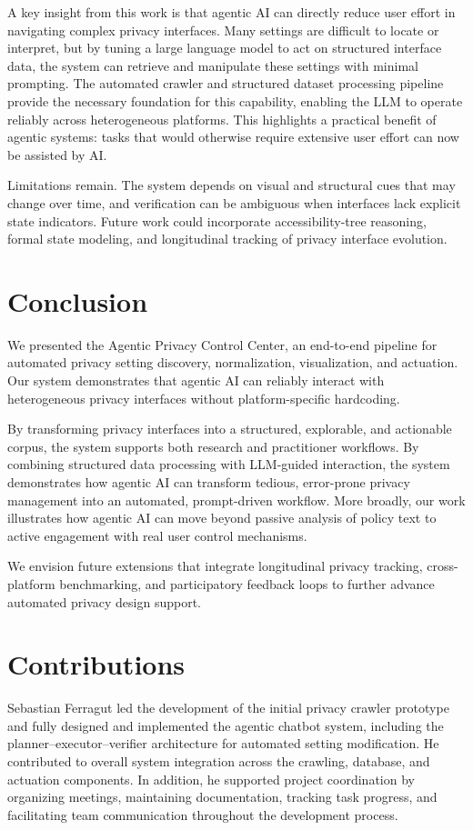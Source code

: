 \documentclass[12pt,letterpaper]{article}
\begin{document}
A key insight from this work is that agentic AI can directly reduce user effort in navigating complex privacy interfaces. Many settings are difficult to locate or interpret, but by tuning a large language model to act on structured interface data, the system can retrieve and manipulate these settings with minimal prompting. The automated crawler and structured dataset processing pipeline provide the necessary foundation for this capability, enabling the LLM to operate reliably across heterogeneous platforms. This highlights a practical benefit of agentic systems: tasks that would otherwise require extensive user effort can now be assisted by AI.

Limitations remain. The system depends on visual and structural cues that may change over time, and verification can be ambiguous when interfaces lack explicit state indicators. Future work could incorporate accessibility-tree reasoning, formal state modeling, and longitudinal tracking of privacy interface evolution.

\section{Conclusion }
We presented the Agentic Privacy Control Center, an end-to-end pipeline for automated privacy setting discovery, normalization, visualization, and actuation. Our system demonstrates that agentic AI can reliably interact with heterogeneous privacy interfaces without platform-specific hardcoding.

By transforming privacy interfaces into a structured, explorable, and actionable corpus, the system supports both research and practitioner workflows. By combining structured data processing with LLM-guided interaction, the system demonstrates how agentic AI can transform tedious, error-prone privacy management into an automated, prompt-driven workflow. More broadly, our work illustrates how agentic AI can move beyond passive analysis of policy text to active engagement with real user control mechanisms.

We envision future extensions that integrate longitudinal privacy tracking, cross-platform benchmarking, and participatory feedback loops to further advance automated privacy design support.

\section{Contributions }
Sebastian Ferragut led the development of the initial privacy crawler prototype and fully designed and implemented the agentic chatbot system, including the planner–executor–verifier architecture for automated setting modification. He contributed to overall system integration across the crawling, database, and actuation components. In addition, he supported project coordination by organizing meetings, maintaining documentation, tracking task progress, and facilitating team communication throughout the development process.
 
\end{document}
